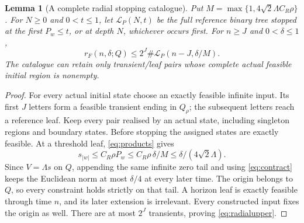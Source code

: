 \documentclass[11pt]{amsart}
\newtheorem{lemma}[theorem]{Lemma}
\theoremstyle{definition}
\theoremstyle{remark}
\numberwithin{equation}{section}
\begin{document}
\begin{lemma}[A complete radial stopping catalogue]\label{lem:stopping}
Put $M=\max\{1,4\sqrt2\Lambda C_R\rho\}$.
For $N\ge0$ and $0<t\le1$, let $\mathcal L_P(N,t)$ be the full
reference binary tree stopped at the first $P_w\le t$, or at
depth $N$, whichever occurs first. For $n\ge J$ and $0<\delta\le1$,
\begin{equation}\label{eq:radialupper}
r_F(n,\delta;Q)\le 2^J\#\mathcal L_P(n-J,\delta/M).
\end{equation}
The catalogue can retain only transient/leaf pairs whose complete
actual feasible initial region is nonempty.
\end{lemma}
\begin{proof}
For every actual initial state choose an exactly feasible infinite
input. Its first $J$ letters form a feasible transient ending in
$Q_\rho$; the subsequent letters reach a reference leaf.
Keep every pair realised by an actual state, including singleton
regions and boundary states. Before stopping the assigned states
are exactly feasible. At a threshold leaf, \eqref{eq:products} gives
\[
s_{|w|}\le C_R\rho P_w\le C_R\rho\,\delta/M
                         \le\delta/(4\sqrt2\Lambda).
\]
Since $V=\Lambda s$ on $Q$, appending the same infinite zero tail
and using \eqref{eq:contract} keeps the Euclidean norm at most
$\delta/4$ at every later time. The origin belongs to $Q$,
so every constraint holds strictly on that tail. A horizon leaf
is exactly feasible through time $n$, and its later extension is
irrelevant. Every constructed input fixes the origin as well.
There are at most $2^J$ transients, proving \eqref{eq:radialupper}.
\end{proof}
\end{document}
